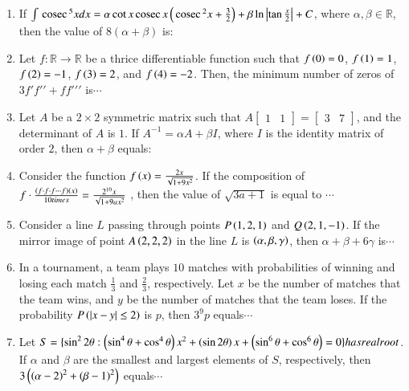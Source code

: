 \documentclass[journal,12pt,twocolumn]{IEEEtran}
\theoremstyle{remark}
\begin{document}
\begin{enumerate}[start=16]
    \item If $\int \,\text{cosec}\,^5 x dx = \alpha \cot x \,\text{cosec}\, x\left(\,\text{cosec}\,^2 x +\frac{3}{2}\right) + \beta\ln\left\vert \tan \frac{x}{2}\right\vert + C$, where $\alpha, \beta \in \mathbb{R}$, then the value of $8(\alpha + \beta)$ is:
    

    \item Let $f : \mathbb{R} \to \mathbb{R}$ be a thrice differentiable function such that $f\left(0\right) = 0$, $f\left(1\right) = 1$, $f\left(2\right) = -1$, $f\left(3\right) = 2$, and $f\left(4\right) = -2$. Then, the minimum number of zeros of $3f\prime f\prime\prime+ff\prime\prime\prime$ is$\cdots$
    

    \item Let $A$ be a $2 \times 2$ symmetric matrix such that $A  \begin{bmatrix} 1 & 1 \end{bmatrix}=\begin{bmatrix} 3 & 7     \end{bmatrix}$, and the determinant of $A$ is $1$. If $A^{-1} = \alpha A + \beta I$, where $I$ is the identity matrix of order $2$, then $\alpha + \beta$ equals:
   
	    \item Consider the function $f\left(x\right) = \frac{2x}{\sqrt{1 + 9x^2}}$. If the composition of $f\cdot\frac{\left(f\cdot f \cdot f \cdots f\right)\left(x\right)}{10 times}=\frac{2^{10}x}{\sqrt{1+9ax^2}}$ , then the value of $\sqrt{3a+1}$ is equal to $\cdots$
    

    \item Consider a line $L$ passing through points $P\left(1, 2, 1\right)$ and $Q\left(2, 1, -1\right)$. If the mirror image of point $A\left(2, 2, 2\right)$ in the line $L$ is $\left(\alpha, \beta, \gamma\right)$, then $\alpha + \beta + 6\gamma$ is$\cdots$
    

    \item In a tournament, a team plays $10$ matches with probabilities of winning and losing each match $\frac{1}{3}$ and $\frac{2}{3}$, respectively. Let $x$ be the number of matches that the team wins, and $y$ be the number of matches that the team loses. If the probability $P\left(\left\vert x - y\right\vert \leq 2\right)$ is $p$, then $3^9p$ equals$\cdots$
   

    \item Let $S = \{ \sin^2 2\theta:\left(\sin^4 \theta +\cos^4
	    \theta\right)x^2+\left( \sin2 \theta\right)x +\left(\sin^6 \theta+  \cos^6\theta\right) = 0 \} has real root$. If $\alpha$ and $\beta$ are the smallest and largest elements of $S$, respectively, then $3\left(\left(\alpha - 2\right)^2 + \left(\beta - 1\right)^2\right)$ equals$\cdots$
    



\end{enumerate}
\end{document}

